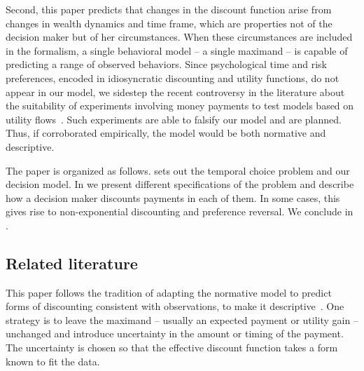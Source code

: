 Second, this paper predicts that changes in the discount function arise from changes in wealth dynamics and time frame, which are properties not of the decision maker but of her circumstances. When these circumstances are included in the formalism, a single behavioral model -- a single maximand -- is capable of predicting a range of observed behaviors. Since psychological time and risk preferences, encoded in idiosyncratic discounting and utility functions, do not appear in our model, we sidestep the recent controversy in the literature about the suitability of experiments involving money payments to test models based on utility flows~\citep{CohenETAL2019}. Such experiments are able to falsify our model and are planned. Thus, if corroborated empirically, the model would be both normative and descriptive.

The paper is organized as follows.  sets out the temporal choice problem and our decision model. In  we present different specifications of the problem and describe how a decision maker discounts payments in each of them. In some cases, this gives rise to non-exponential discounting and preference reversal. We conclude in .

\subsection{Related literature\label{sec:literature}}

This paper follows the tradition of adapting the normative model to predict forms of discounting consistent with observations, \ie to make it descriptive~\citep{Kacelnik1997}. One strategy is to leave the maximand -- usually an expected payment or utility gain -- unchanged and introduce uncertainty in the amount or timing of the payment. The uncertainty is chosen so that the effective discount function takes a form known to fit the data.

